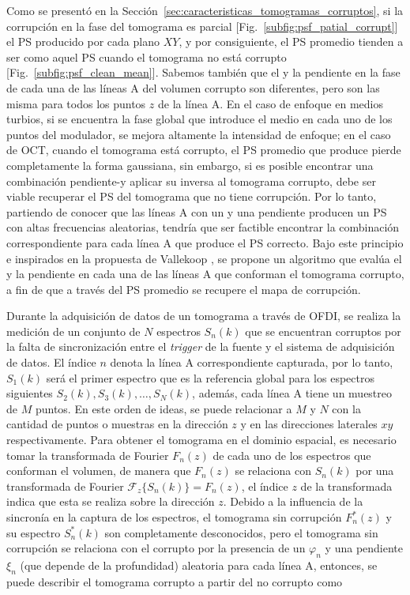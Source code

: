 Como se presentó en la Sección~\ref{sec:caracteristicas_tomogramas_corruptos}, si la corrupción en la fase del tomograma es parcial [Fig.~\ref{subfig:psf_patial_corrupt}] el PS producido por cada plano $XY$, y por consiguiente, el PS promedio tienden a ser como aquel PS cuando el tomograma no está corrupto [Fig.~\ref{subfig:psf_clean_mean}]. Sabemos también que el \offset y la pendiente en la fase de cada una de las líneas A del volumen corrupto son diferentes, pero son las misma para todos los puntos $z$ de la línea A. En el caso de enfoque en medios turbios, si se encuentra la fase global que introduce el medio en cada uno de los puntos del modulador, se mejora altamente la intensidad de enfoque; en el caso de OCT, cuando el tomograma está corrupto, el PS promedio que produce pierde completamente la forma gaussiana, sin embargo, si es posible encontrar una combinación pendiente-\offset y aplicar su inversa al tomograma corrupto, debe ser viable recuperar el PS del tomograma que no tiene corrupción. Por lo tanto, partiendo de conocer que las líneas A con un \offset y una pendiente producen un PS con altas frecuencias aleatorias, tendría que ser factible encontrar la combinación correspondiente para cada línea A que produce el PS correcto. Bajo este principio e inspirados en la propuesta de Vallekoop \etal \cite{Vallekoop2007}, se propone un algoritmo que evalúa el \offset y la pendiente en cada una de las líneas A que conforman el tomograma corrupto, a fin de que a través del PS promedio se recupere el mapa de corrupción.%

Durante la adquisición de datos de un tomograma a través de OFDI, se realiza la medición de un conjunto de $N$ espectros $S_n(k)$ que se encuentran corruptos por la falta de sincronización entre el \textit{trigger} de la fuente y el sistema de adquisición de datos. El índice $n$ denota la línea A correspondiente capturada, por lo tanto, $S_1(k)$ será el primer espectro que es la referencia global para los espectros siguientes $S_2(k), S_3(k), \ldots, S_N(k)$, además, cada línea A tiene un muestreo de $M$ puntos. En este orden de ideas, se puede relacionar a $M$ y $N$ con la cantidad de puntos o muestras en la dirección $z$ y en las direcciones laterales $xy$ respectivamente. Para obtener el tomograma en el dominio espacial, es necesario tomar la transformada de Fourier $F_n(z)$ de cada uno de los espectros que conforman el volumen, de manera que $F_n(z)$ se relaciona con $S_n(k)$ por una transformada de Fourier $\mathscr{F}_{z} \big\{S_n(k)\big\} = F_n(z)$, el índice $z$ de la transformada indica que esta se realiza sobre la dirección $z$. Debido a la influencia de la sincronía en la captura de los espectros, el tomograma sin corrupción $F^{\ast}_n(z)$ y su espectro $S^{\ast}_n(k)$ son completamente desconocidos, pero el tomograma sin corrupción se relaciona con el corrupto por la presencia de un \offset $\varphi_n$ y una pendiente $\xi_n$ (que depende de la profundidad) aleatoria para cada línea A, entonces, se puede describir el tomograma corrupto a partir del no corrupto como



